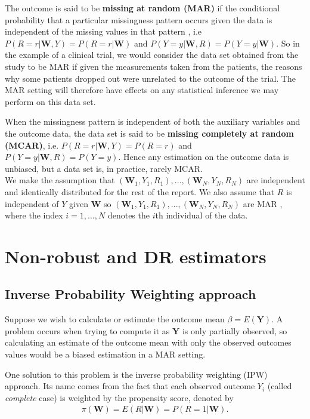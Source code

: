 \documentclass[12pt,twoside]{article}
\begin{document}
The outcome is said to be \textbf{missing at random (MAR)} if the conditional probability that a particular missingness pattern occurs given the data is independent of the missing values in that pattern \citep{vansteelandt}, i.e $P(R=r|\mathbf{W}, Y) = P(R= r|\mathbf{W})$ and  $P(Y=y|\mathbf{W}, R) = P(Y=y|\mathbf{W})$. So in the example of a clinical trial, we would consider the data set obtained from the study to be MAR if given the measurements taken from the patients, the reasons why some patients dropped out were unrelated to the outcome of the trial. The MAR setting will therefore have effects on any statistical inference we may perform on this data set.

When the missingness pattern is independent of both the auxiliary variables and the outcome data, the data set is said to be \textbf{missing completely at random (MCAR)}, i.e. $P(R=r|\mathbf{W}, Y) = P(R = r)$ and  $P(Y=y|\mathbf{W}, R) = P(Y=y)$. Hence any estimation on the outcome data is unbiased, but a data set is, in practice, rarely MCAR.\\

We make the assumption that $(\mathbf{W}_1, Y_1, R_1),...,(\mathbf{W}_N, Y_N, R_N)$ are independent and identically distributed for the rest of the report. We also assume that $R$ is independent of $Y$ given $\mathbf{W}$ so $(\mathbf{W}_1, Y_1, R_1), ... ,(\mathbf{W}_N, Y_N, R_N)$ are MAR \citep{vansteelandt}, where the index $i = 1,...,N$ denotes the $i$th individual of the data.\\

\section{Non-robust and DR estimators}

\subsection{Inverse Probability Weighting approach}

Suppose we wish to calculate or estimate the outcome mean $\beta = E(\mathbf{Y})$. A problem occurs when trying to compute it as $\mathbf{Y}$ is only partially observed, so calculating an estimate of the outcome mean with only the observed outcomes values would be a biased estimation in a MAR setting.

One solution to this problem is the inverse probability weighting (IPW) approach. Its name comes from the fact that each observed outcome $Y_i$ (called \textit{complete} case) is weighted by the propensity score, denoted by
\begin{align*}
    \pi(\mathbf{W})= E(R|\mathbf{W}) = P(R = 1|\mathbf{W}).
\end{align*}
\end{document}
